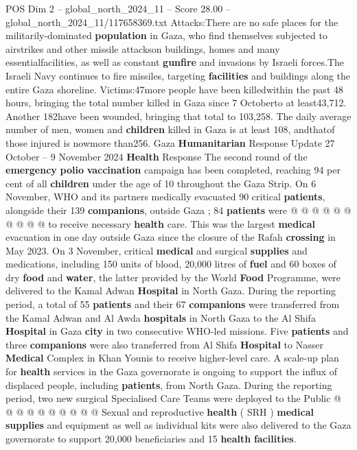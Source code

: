 \begin{textsample}{POS Dim 2 – global\_north\_2024\_11 – Score 28.00 – global\_north\_2024\_11/117658369.txt}  \label{ex:f2_pos_355}
Attacks:There are no safe places for the militarily-dominated \textbf{population} in Gaza, who find themselves subjected to airstrikes and other missile attackson buildings, homes and many essentialfacilities, as well as constant \textbf{gunfire} and invasions by Israeli forces.The Israeli Navy continues to fire missiles, targeting \textbf{facilities} and buildings along the entire Gaza shoreline.
Victims:47more people have been killedwithin the past 48 hours, bringing the total number killed in Gaza since 7 Octoberto at least43,712.
Another 182have been wounded, bringing that total to 103,258.
The daily average number of men, women and \textbf{children} killed in Gaza is at least 108, andthatof those injured is nowmore than256.
Gaza \textbf{Humanitarian} Response Update 27 October -- 9 November 2024 \textbf{Health} Response The second round of the \textbf{emergency} \textbf{polio} \textbf{vaccination} campaign has been completed, reaching 94 per cent of all \textbf{children} under the age of 10 throughout the Gaza Strip.
On 6 November, WHO and its partners medically evacuated 90 critical \textbf{patients}, alongside their 139 \textbf{companions}, outside Gaza ; 84 \textbf{patients} were @ @ @ @ @ @ @ @ @ @ to receive necessary \textbf{health} care.
This was the largest \textbf{medical} evacuation in one day outside Gaza since the closure of the Rafah \textbf{crossing} in May 2023.
On 3 November, critical \textbf{medical} and surgical \textbf{supplies} and medications, including 150 units of blood, 20,000 litres of \textbf{fuel} and 60 boxes of dry \textbf{food} and \textbf{water}, the latter provided by the World \textbf{Food} Programme, were delivered to the Kamal Adwan \textbf{Hospital} in North Gaza.
During the reporting period, a total of 55 \textbf{patients} and their 67 \textbf{companions} were transferred from the Kamal Adwan and Al Awda \textbf{hospitals} in North Gaza to the Al Shifa \textbf{Hospital} in Gaza \textbf{city} in two consecutive WHO-led missions.
Five \textbf{patients} and three \textbf{companions} were also transferred from Al Shifa \textbf{Hospital} to Nasser \textbf{Medical} Complex in Khan Younis to receive higher-level care.
A scale-up plan for \textbf{health} services in the Gaza governorate is ongoing to support the influx of displaced people, including \textbf{patients}, from North Gaza.
During the reporting period, two new surgical Specialised Care Teams were deployed to the Public @ @ @ @ @ @ @ @ @ @ Sexual and reproductive \textbf{health} ( SRH ) \textbf{medical} \textbf{supplies} and equipment as well as individual kits were also delivered to the Gaza governorate to support 20,000 beneficiaries and 15 \textbf{health} \textbf{facilities}.

\end{textsample}
